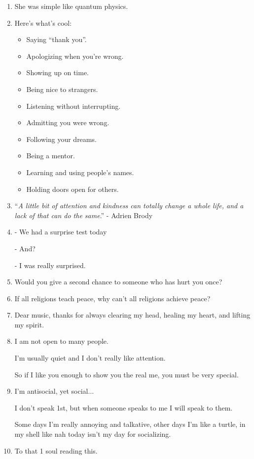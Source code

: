 \documentclass{article}
\numberwithin{equation}{section}
\begin{document}
\begin{enumerate}
    Like where to park my yacht$\ldots$
    \item She was simple like quantum physics.
    \item Here's what's cool:
    \begin{itemize}
        \item[1.] Saying ``thank you''.
        \item[2.] Apologizing when you're wrong.
        \item[3.] Showing up on time.
        \item[4.] Being nice to strangers.
        \item[5.] Listening without interrupting.
        \item[6.] Admitting you were wrong.
        \item[7.] Following your dreams.
        \item[8.] Being a mentor.
        \item[9.] Learning and using people's names.
        \item[10.] Holding doors open for others.
    \end{itemize}
    \item ``\textit{A little bit of attention and kindness can totally change a whole life, and a lack of that can do the same}.'' - Adrien Brody
    \item - We had a surprise test today
    
    - And?
    
    - I was really surprised.
    \item Would you give a second chance to someone who has hurt you once?
    \item If all religions teach peace, why can't all religions achieve peace?
    \item Dear music, thanks for always clearing my head, healing my heart, and lifting my spirit.
    \item I am not open to many people.
    
    I'm usually quiet and I don't really like attention.
    
    So if I like you enough to show you the real me, you must be very special.
    \item I'm antisocial, yet social$\ldots$
    
    I don't speak 1st, but when someone speaks to me I will speak to them.
    
    Some days I'm really annoying and talkative, other days I'm like a turtle, in my shell like nah today isn't my day for socializing.
    \item To that 1 soul reading this.
    

\end{enumerate}
\end{document}
